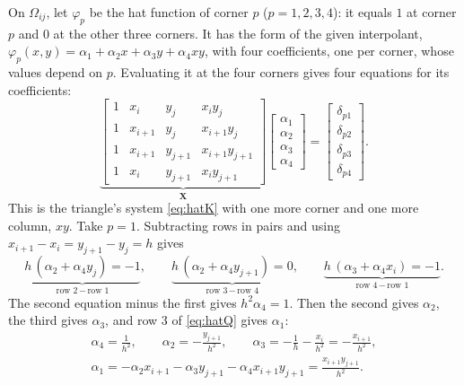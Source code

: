 \documentclass[11pt]{article}
\newcommand{\Om}{\Omega}
\begin{document}
On $\Om_{ij}$, let $\varphi_{p}$ be the hat function of corner $p$
($p=1,2,3,4$): it equals $1$ at corner $p$ and $0$ at the other three
corners.  It has the form of the given interpolant,
$\varphi_{p}(x,y)=\alpha_{1}+\alpha_{2}x+\alpha_{3}y+\alpha_{4}xy$, with four
coefficients, one per corner, whose values depend on $p$.  Evaluating it at the four corners gives four equations for its
coefficients:
\begin{equation}\label{eq:hatQ}
  \underbrace{\begin{bmatrix}
    1&x_{i}&y_{j}&x_{i}y_{j}\\
    1&x_{i+1}&y_{j}&x_{i+1}y_{j}\\
    1&x_{i+1}&y_{j+1}&x_{i+1}y_{j+1}\\
    1&x_{i}&y_{j+1}&x_{i}y_{j+1}\end{bmatrix}}_{\bm X}
  \begin{bmatrix}\alpha_{1}\\\alpha_{2}\\\alpha_{3}\\\alpha_{4}\end{bmatrix}
  =\begin{bmatrix}\delta_{p1}\\\delta_{p2}\\\delta_{p3}\\\delta_{p4}\end{bmatrix}.
\end{equation}
This is the triangle's system \eqref{eq:hatK} with one more corner and one
more column, $xy$.  Take $p=1$.  Subtracting rows in pairs and using
$x_{i+1}-x_{i}=y_{j+1}-y_{j}=h$ gives
\begin{equation}\label{eq:elimQ}
  \underbrace{h\,(\alpha_{2}+\alpha_{4}y_{j})=-1}_{\text{row 2}\,-\,\text{row 1}},\qquad
  \underbrace{h\,(\alpha_{2}+\alpha_{4}y_{j+1})=0}_{\text{row 3}\,-\,\text{row 4}},\qquad
  \underbrace{h\,(\alpha_{3}+\alpha_{4}x_{i})=-1}_{\text{row 4}\,-\,\text{row 1}} .
\end{equation}
The second equation minus the first gives $h^{2}\alpha_{4}=1$.  Then the
second gives $\alpha_{2}$, the third gives $\alpha_{3}$, and row 3 of
\eqref{eq:hatQ} gives $\alpha_{1}$:
\begin{gather*}
  \alpha_{4}=\frac{1}{h^{2}},\qquad
  \alpha_{2}=-\frac{y_{j+1}}{h^{2}},\qquad
  \alpha_{3}=-\frac{1}{h}-\frac{x_{i}}{h^{2}}=-\frac{x_{i+1}}{h^{2}},\\
  \alpha_{1}=-\alpha_{2}x_{i+1}-\alpha_{3}y_{j+1}-\alpha_{4}x_{i+1}y_{j+1}=\frac{x_{i+1}y_{j+1}}{h^{2}} .
\end{gather*}
\end{document}

